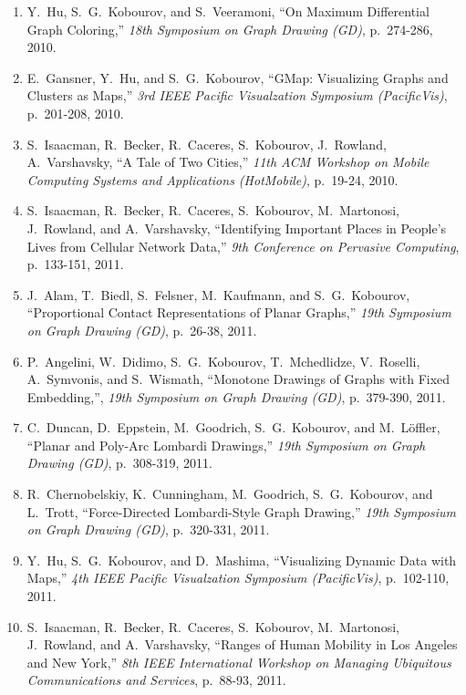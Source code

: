 \documentclass[10pt]{article}
\begin{document}
\begin{description}
\begin{enumerate}
\item Y.~Hu, S.~G.~Kobourov, and S.~Veeramoni, ``On Maximum
  Differential Graph Coloring,'' {\em 18th Symposium on Graph Drawing
    (GD)}, p.~274-286, 2010.


\item E.~Gansner, Y.~Hu, and S.~G.~Kobourov, ``GMap: Visualizing Graphs and Clusters as Maps,''  {\em 3rd IEEE Pacific Visualzation Symposium (PacificVis)}, p.~201-208, 2010. 


\item S.~Isaacman, R.~Becker, R.~Caceres, S.~Kobourov, J.~Rowland,
  A.~Varshavsky, ``A Tale of Two Cities,'' {\em 11th ACM Workshop on
    Mobile Computing Systems and Applications (HotMobile)}, p.~19-24, 2010.

\item S.~Isaacman, R.~Becker, R.~Caceres, S.~Kobourov, M.~Martonosi,
  J.~Rowland, and
  A.~Varshavsky, ``Identifying Important Places in People's Lives
  from Cellular Network Data,'' {\em 9th Conference on Pervasive Computing}, p.~133-151, 2011.


\item J.~Alam, T.~Biedl, S.~Felsner, M.~Kaufmann, and S.~G.~Kobourov,
  ``Proportional Contact Representations of Planar Graphs,''  {\em 19th Symposium on Graph Drawing
    (GD)}, p.~26-38, 2011.

\item P.~Angelini, W.~Didimo, S.~G.~Kobourov, T.~Mchedlidze,
  V.~Roselli, A.~Symvonis, and S.~Wismath, ``Monotone Drawings of Graphs
  with Fixed Embedding,'',  {\em 19th Symposium on Graph Drawing
    (GD)}, p.~379-390, 2011.

\item C.~Duncan, D.~Eppstein, M.~Goodrich, S.~G.~Kobourov, and
  M.~L\"offler, ``Planar and Poly-Arc Lombardi Drawings,''  {\em 19th Symposium on Graph Drawing
    (GD)}, p.~308-319, 2011.

\item R.~Chernobelskiy, K.~Cunningham, M.~Goodrich, S.~G.~Kobourov, and
  L.~Trott, ``Force-Directed Lombardi-Style Graph Drawing,''  {\em 19th Symposium on Graph Drawing
    (GD)}, p.~320-331, 2011.


\item Y.~Hu, S.~G.~Kobourov, and D.~Mashima, ``Visualizing Dynamic
  Data with Maps,''  {\em 4th IEEE Pacific Visualzation Symposium
    (PacificVis)}, p.~102-110, 2011.

\item S.~Isaacman, R.~Becker, R.~Caceres, S.~Kobourov, M.~Martonosi,
  J.~Rowland, and 
  A.~Varshavsky, ``Ranges of Human Mobility in Los Angeles and New
  York,'' {\em 8th IEEE International Workshop on Managing Ubiquitous
    Communications and Services}, p.~88-93, 2011.


\end{enumerate}
\end{description}
\end{document}
